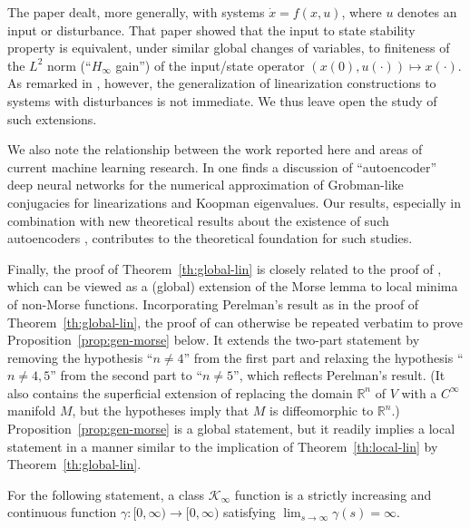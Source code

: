 \documentclass[11pt]{amsart}
\newcommand{\R}{\mathbb{R}}
\theoremstyle{definition}
\begin{document}
The paper \cite{grune1999asymptotic} dealt, more generally, with systems $\dot x = f(x,u)$, where $u$ denotes an input or disturbance. That paper showed that the input to state stability property \cite{mct} is equivalent, under similar global changes of variables, to finiteness of the $L^2$ norm (``$H_\infty$ gain'') of the input/state operator $(x(0),u(\cdot))\mapsto x(\cdot)$. As remarked in \cite{grune1999asymptotic}, however, the generalization of linearization constructions to systems with disturbances is not immediate. We thus leave open the study of such extensions.

We also note the relationship between the work reported here and areas of current machine learning research. In \cite[Chapter 6]{bramburger} one finds a discussion of ``autoencoder'' deep neural networks for the  numerical approximation of Grobman-like conjugacies for linearizations and Koopman eigenvalues. Our results, especially in combination with new theoretical results about the existence of such autoencoders \cite{kvalheim_sontag_2023autoencoders}, contributes to the theoretical foundation for such studies.

Finally, the proof of Theorem~\ref{th:global-lin} is closely related to the proof of \cite[Prop.~1]{grune1999asymptotic}, which can be viewed as a (global) extension of the Morse lemma \cite[Lem.~2.2]{milnor1963morse} to local minima of non-Morse functions.
Incorporating Perelman's result as in the proof of Theorem~\ref{th:global-lin}, the proof of \cite[Prop.~1]{grune1999asymptotic} can otherwise be repeated verbatim to prove Proposition~\ref{prop:gen-morse} below.
It extends the two-part statement \cite[Prop.~1]{grune1999asymptotic} by removing the hypothesis ``$n\neq 4$'' from the first part and relaxing the hypothesis ``$n\neq 4,5$'' from the second part to ``$n\neq 5$'', which reflects Perelman's result.
(It also contains the superficial extension of replacing the domain $\R^n$ of $V$ with a $C^\infty$ manifold $M$, but the hypotheses imply that $M$ is diffeomorphic to $\R^n$.)
Proposition~\ref{prop:gen-morse} is a global statement, but it readily implies a local statement in a manner similar to the implication of Theorem~\ref{th:local-lin} by Theorem~\ref{th:global-lin}.

For the following statement, a class $\mathcal{K}_\infty$ function is a strictly increasing and continuous function $\gamma\colon [0,\infty)\to [0,\infty)$ satisfying $\lim_{s\to\infty}\gamma(s)=\infty$.
\end{document}
